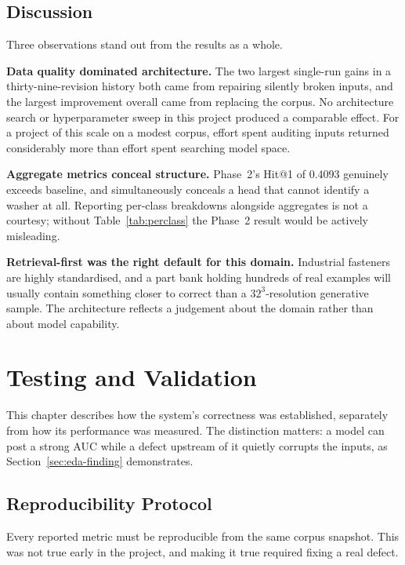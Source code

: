 \documentclass[12pt,oneside,a4paper]{report}
\begin{document}
\section{Discussion}

Three observations stand out from the results as a whole.

\textbf{Data quality dominated architecture.} The two largest single-run
gains in a thirty-nine-revision history both came from repairing silently
broken inputs, and the largest improvement overall came from replacing the
corpus. No architecture search or hyperparameter sweep in this project
produced a comparable effect. For a project of this scale on a modest corpus,
effort spent auditing inputs returned considerably more than effort spent
searching model space.

\textbf{Aggregate metrics conceal structure.} Phase~2's Hit@1 of 0.4093
genuinely exceeds baseline, and simultaneously conceals a head that cannot
identify a washer at all. Reporting per-class breakdowns alongside aggregates
is not a courtesy; without Table~\ref{tab:perclass} the Phase~2 result would
be actively misleading.

\textbf{Retrieval-first was the right default for this domain.} Industrial
fasteners are highly standardised, and a part bank holding hundreds of real
examples will usually contain something closer to correct than a
$32^3$-resolution generative sample. The architecture reflects a judgement
about the domain rather than about model capability.

\chapter{Testing and Validation}

This chapter describes how the system's correctness was established, separately
from how its performance was measured. The distinction matters: a model can
post a strong AUC while a defect upstream of it quietly corrupts the inputs, as
Section~\ref{sec:eda-finding} demonstrates.

\section{Reproducibility Protocol}

Every reported metric must be reproducible from the same corpus snapshot. This
was not true early in the project, and making it true required fixing a real
defect.
\end{document}
